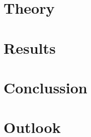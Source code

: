 \documentclass[12pt, oneside]{book}
\begin{document}

\chapter{Theory}
\label{chap:theo}



\chapter{Results}
\label{chap:res}



\chapter{Conclussion}
\label{chap:con}


\chapter{Outlook}
\label{chap:out}









\appendix
{}

\end{document}
